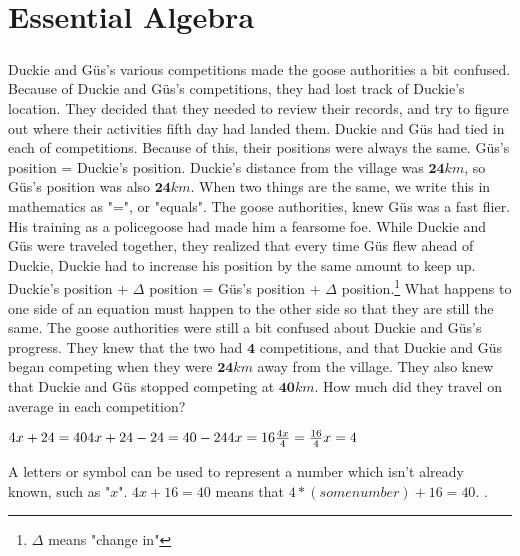 \chapter{Essential Algebra}
\paragraph{} Duckie and G{\"u}s's various competitions made the goose authorities a bit confused. Because of Duckie and G{\"u}s's competitions, they had lost track of Duckie's location. They decided that they needed to review their records, and try to figure out where their activities fifth day had landed them. 
\vfill
\pagebreak
{Duckie and G{\"u}s had tied in each of competitions. Because of this, their positions were always the same.}
{G{\"u}s's position = Duckie's position. Duckie's distance from the village was $\mathbf{24}km$, so G{\"u}s's position was also $\mathbf{24}km$.}
{When two things are the same, we write this in mathematics as "=", or "equals".}
{}
{The goose authorities, knew G{\"u}s was a fast flier. His training as a policegoose had made him a fearsome foe. While Duckie and G{\"u}s were traveled together, they realized that every time G{\"u}s flew ahead of Duckie, Duckie had to increase his position by the same amount to keep up.}
{Duckie's position + $\Delta$ position = G{\"u}s's position + $\Delta$ position.\footnote{$\Delta$ means "change in"}}
{What happens to one side of an equation must happen to the other side so that they are still the same.}
{}
{The goose authorities were still a bit confused about Duckie and G{\"u}s's progress. They knew that the two had $\mathbf{4}$ competitions, and that Duckie and G{\"u}s began competing when they were $\mathbf{24} km$ away from the village. They also knew that Duckie and G{\"u}s stopped competing at $\mathbf{40} km$. How much did they travel on average in each competition?}
{\begin{center}$4x + 24 = 40 \linebreak 4x + 24 - 24= 40 - 24 \linebreak 4x = 16 \linebreak \frac{4x}{4} = \frac{16}{4} \linebreak x = 4  $\end{center}}
{A letters or symbol can be used to represent a number which isn’t already known, such as "$x$". $4x + 16 = 40$ means that $4\ast(some number) + 16 = 40$.}
{}.
